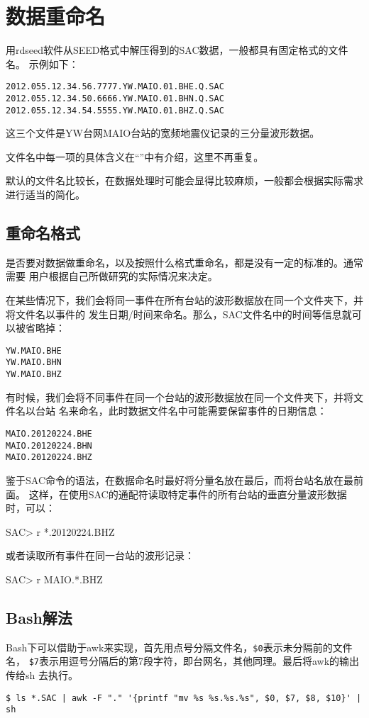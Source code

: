 \section{数据重命名}
用rdseed软件从SEED格式中解压得到的SAC数据，一般都具有固定格式的文件名。
示例如下：
\begin{verbatim}
2012.055.12.34.56.7777.YW.MAIO.01.BHE.Q.SAC
2012.055.12.34.50.6666.YW.MAIO.01.BHN.Q.SAC
2012.055.12.34.54.5555.YW.MAIO.01.BHZ.Q.SAC
\end{verbatim}
这三个文件是YW台网MAIO台站的宽频地震仪记录的三分量波形数据。

文件名中每一项的具体含义在``''中有介绍，这里不再重复。

默认的文件名比较长，在数据处理时可能会显得比较麻烦，一般都会根据实际需求进行适当的简化。

\subsection{重命名格式}
是否要对数据做重命名，以及按照什么格式重命名，都是没有一定的标准的。通常需要
用户根据自己所做研究的实际情况来决定。

在某些情况下，我们会将同一事件在所有台站的波形数据放在同一个文件夹下，并将文件名以事件的
发生日期/时间来命名。那么，SAC文件名中的时间等信息就可以被省略掉：
\begin{verbatim}
YW.MAIO.BHE
YW.MAIO.BHN
YW.MAIO.BHZ
\end{verbatim}

有时候，我们会将不同事件在同一个台站的波形数据放在同一个文件夹下，并将文件名以台站
名来命名，此时数据文件名中可能需要保留事件的日期信息：
\begin{verbatim}
MAIO.20120224.BHE
MAIO.20120224.BHN
MAIO.20120224.BHZ
\end{verbatim}

鉴于SAC命令的语法，在数据命名时最好将分量名放在最后，而将台站名放在最前面。
这样，在使用SAC的通配符读取特定事件的所有台站的垂直分量波形数据时，可以：
\begin{SACCode}
SAC> r *.20120224.BHZ
\end{SACCode}
或者读取所有事件在同一台站的波形记录：
\begin{SACCode}
SAC> r MAIO.*.BHZ
\end{SACCode}

\subsection{Bash解法}
Bash下可以借助于awk来实现，首先用点号分隔文件名，\verb+$0+表示未分隔前的文件名，
\verb+$7+表示用逗号分隔后的第7段字符，即台网名，其他同理。最后将awk的输出传给sh
去执行。
\begin{verbatim}
$ ls *.SAC | awk -F "." '{printf "mv %s %s.%s.%s", $0, $7, $8, $10}' | sh
\end{verbatim}

